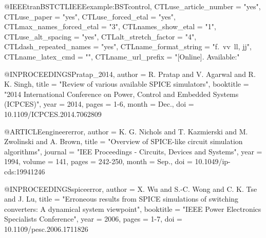 \documentclass[conference]{IEEEtran}
\begin{document}
\begin{thebibliography}

@IEEEtranBSTCTL{IEEEexample:BSTcontrol,
  CTLuse_article_number     = "yes",
  CTLuse_paper              = "yes",
  CTLuse_forced_etal        = "yes",
  CTLmax_names_forced_etal  = "3",
  CTLnames_show_etal        = "1",
  CTLuse_alt_spacing        = "yes",
  CTLalt_stretch_factor     = "4",
  CTLdash_repeated_names    = "yes",
  CTLname_format_string     = "{f.~}{vv~}{ll}{, jj}",
  CTLname_latex_cmd         = "",
  CTLname_url_prefix        = "[Online]. Available:"
}


@INPROCEEDINGS{Pratap_2014,
    author      =   {R. {Pratap} and V. {Agarwal} and R. K. {Singh}},
    title       =   "{Review of various available {SPICE} simulators}",
    booktitle   =   "{2014 International Conference on Power, Control and Embedded Systems (ICPCES)}",
    year        =   {2014},
    pages       =   {1-6},
    month       =   {Dec.},
    doi         =   {10.1109/ICPCES.2014.7062809}
}

@ARTICLE{engineererror,
    author      =   {K. G. {Nichols} and T. {Kazmierski} and M. {Zwolinski} and A. {Brown}},
    title       =   "{Overview of {SPICE}-like circuit simulation algorithms}",
    journal     =   "{IEE Proceedings - Circuits, Devices and Systems}",
    year        =   {1994},
    volume      =   {141},
    pages       =   {242-250},
    month       =   {Sep.},
    doi         =   {10.1049/ip-cds:19941246}
}

@INPROCEEDINGS{spiceerror,
    author      =   {X. {Wu} and S.-C. {Wong} and C. K. {Tse} and J. {Lu}},
    title       =   "{Erroneous results from {SPICE} simulations of switching converters: A dynamical system viewpoint}",
    booktitle   =   "{IEEE Power Electronics Specialists Conference}",
    year        =   {2006},
    pages       =   {1-7},
    doi         =   {10.1109/pesc.2006.1711826}
}


\end{thebibliography}
\end{document}
